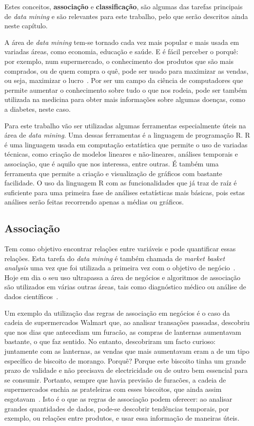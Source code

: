 Estes conceitos, \textbf{associação} e \textbf{classificação}, são algumas das tarefas principais de \textit{data mining} e são relevantes para este trabalho, pelo que serão descritos ainda neste capítulo.


A área de \textit{data mining} tem-se tornado cada vez mais popular e mais usada em variadas áreas, como economia, educação e saúde. E é fácil perceber o porquê: por exemplo, num supermercado, o conhecimento dos produtos que são mais comprados, ou de quem compra o quê, pode ser usado para maximizar as vendas, ou seja, maximizar o lucro~\cite{business}. Por ser um campo da ciência de computadores que permite aumentar o conhecimento sobre tudo o que nos rodeia, pode ser também utilizada na medicina para obter mais informações sobre algumas doenças, como a diabetes, neste caso.

Para este trabalho vão ser utilizadas algumas ferramentas especialmente úteis na área de \textit{data mining}. Uma dessas ferramentas é a linguagem de programação R. R é uma linguagem usada em computação estatística que permite o uso de variadas técnicas, como criação de modelos lineares e não-lineares, análises temporais e associação, que é aquilo que nos interessa, entre outras. É também uma ferramenta que permite a criação e visualização de gráficos com bastante facilidade. O uso da linguagem R com as funcionalidades que já traz de raíz é suficiente para uma primeira fase de análises estatísticas mais básicas, pois estas análises serão feitas recorrendo apenas a médias ou gráficos.

\subsection{Associação}

Tem como objetivo encontrar relações entre variáveis e pode quantificar essas relações. Esta tarefa do \textit{data mining} é também chamada de \textit{market basket analysis} uma vez que foi utilizada a primeira vez com o objetivo de negócio~\cite{business}. Hoje em dia o seu uso ultrapassa a área de negócios e algoritmos de associação são utilizados em várias outras áreas, tais como diagnóstico médico ou análise de dados científicos~\cite{chapter6}.

Um exemplo da utilização das regras de associação em negócios é o caso da cadeia de supermercados Walmart que, ao analisar transações passadas, descobriu que nos dias que antecediam um furacão, as compras de lanternas aumentavam bastante, o que faz sentido. No entanto, descobriram um facto curioso: juntamente com as lanternas, as vendas que mais aumentavam eram a de um tipo específico de biscoito de morango. Porquê? Porque este biscoito tinha um grande prazo de validade e não precisava de electricidade ou de outro bem essencial para se consumir. Portanto, sempre que havia previsão de furacões, a cadeia de supermercados enchia as prateleiras com esses biscoitos, que ainda assim esgotavam~\cite{walmart}.
Isto é o que as regras de associação podem oferecer: ao analisar grandes quantidades de dados, pode-se descobrir tendências temporais, por exemplo, ou relações entre produtos, e usar essa informação de maneiras úteis. 

